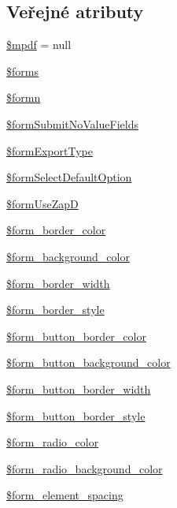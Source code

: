\subsection*{Veřejné atributy}
\begin{DoxyCompactItemize}
\item 
\hyperlink{classform_a2a3e1e7b89808cdbd2692e3218468927}{\$mpdf} = null
\item 
\hyperlink{classform_a05d71686cc8461bf72fb9abb5b7588d1}{\$forms}
\item 
\hyperlink{classform_aed1ff4c0500b4cc1b40a6f14f1b977b5}{\$formn}
\item 
\hyperlink{classform_afb8feff6b45d0e269299adb187236c25}{\$form\-Submit\-No\-Value\-Fields}
\item 
\hyperlink{classform_a2c8a508c5fd3f4ddecda3f3b1cf34aa3}{\$form\-Export\-Type}
\item 
\hyperlink{classform_a5ed3797ff7e798d32836a58890459aee}{\$form\-Select\-Default\-Option}
\item 
\hyperlink{classform_aa769f3bffa78452b1a47b554e00f5d60}{\$form\-Use\-Zap\-D}
\item 
\hyperlink{classform_a12bafecc5132d5cc48675eb4e5b13d57}{\$form\-\_\-border\-\_\-color}
\item 
\hyperlink{classform_aef0107c96ce2b45b0c635acf0d78dddb}{\$form\-\_\-background\-\_\-color}
\item 
\hyperlink{classform_a00cb11df90b366c403346416d9d6c98e}{\$form\-\_\-border\-\_\-width}
\item 
\hyperlink{classform_a8d7da4c8e9d816b67fd5398d8ba4968e}{\$form\-\_\-border\-\_\-style}
\item 
\hyperlink{classform_af26f0d73e6b28146a9272c7ebe5ad3e4}{\$form\-\_\-button\-\_\-border\-\_\-color}
\item 
\hyperlink{classform_a2d0582597db58dceca0e7cdfafc8ddf3}{\$form\-\_\-button\-\_\-background\-\_\-color}
\item 
\hyperlink{classform_a1fcc0c6c54448868422b196600d0c5c0}{\$form\-\_\-button\-\_\-border\-\_\-width}
\item 
\hyperlink{classform_a1cfa1f479abb66109c34488ec49f08d4}{\$form\-\_\-button\-\_\-border\-\_\-style}
\item 
\hyperlink{classform_a9b89418280fe2385669b6fafdf861a42}{\$form\-\_\-radio\-\_\-color}
\item 
\hyperlink{classform_ad50b5b6d442dc295c8c8e65f7b49c42d}{\$form\-\_\-radio\-\_\-background\-\_\-color}
\item 
\hyperlink{classform_a7bc6e7cebca5418b43e712e813022227}{\$form\-\_\-element\-\_\-spacing}

\end{DoxyCompactItemize}
